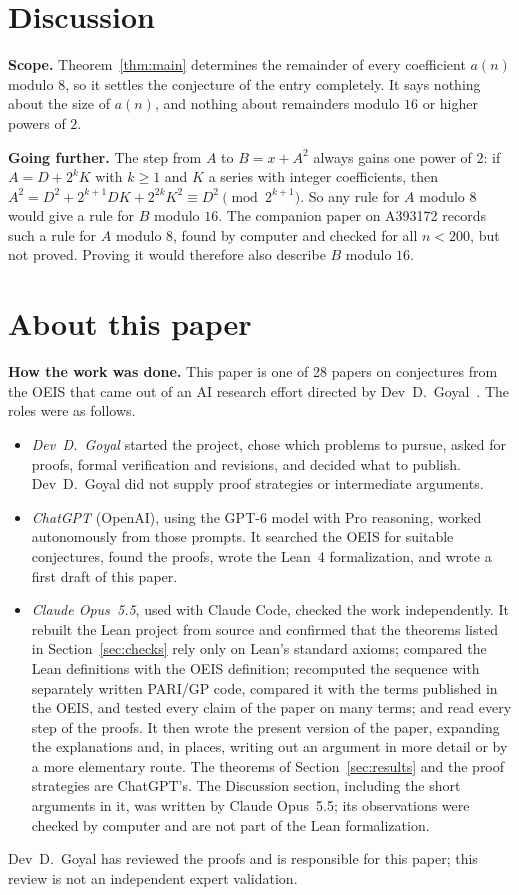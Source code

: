 \documentclass[11pt,a4paper]{article}
\theoremstyle{definition}
\theoremstyle{remark}
\newcommand{\para}[1]{\par\medskip\noindent\textbf{#1}\enspace}
\begin{document}
\section{Discussion}\label{sec:discussion}

\para{Scope.} Theorem~\ref{thm:main} determines the remainder of every coefficient $a(n)$ modulo $8$, so it settles the
conjecture of the entry completely. It says nothing about the size of $a(n)$, and nothing about remainders modulo $16$
or higher powers of $2$.

\para{Going further.} The step from $A$ to $B=x+A^2$ always gains one power of $2$: if $A=D+2^kK$ with $k\ge1$ and $K$ a
series with integer coefficients, then $A^2=D^2+2^{k+1}DK+2^{2k}K^2\equiv D^2\pmod{2^{k+1}}$. So any rule for $A$ modulo
$8$ would give a rule for $B$ modulo $16$. The companion paper on A393172 records such a rule for $A$ modulo $8$, found
by computer and checked for all $n<200$, but not proved. Proving it would therefore also describe $B$ modulo $16$.

\section*{About this paper}\label{sec:about}
\para{How the work was done.}
This paper is one of 28 papers on conjectures from the OEIS that came out of an AI research effort directed by
Dev~D.~Goyal~\cite{repo}. The roles were as follows.
\begin{itemize}
\item \emph{Dev~D.~Goyal} started the project, chose which problems to pursue, asked for proofs, formal verification and
revisions, and decided what to publish. Dev~D.~Goyal did not supply proof strategies or intermediate arguments.
\item \emph{ChatGPT} (OpenAI), using the GPT-6 model with Pro reasoning, worked autonomously from those prompts. It
searched the OEIS for suitable conjectures, found the proofs, wrote the Lean~4 formalization, and wrote a first draft
of this paper.
\item \emph{Claude Opus~5.5}, used with Claude Code, checked the work independently. It rebuilt the Lean project from source and confirmed that the theorems listed in Section~\ref{sec:checks} rely only on
Lean's standard axioms; compared the Lean definitions with the OEIS definition; recomputed the sequence with separately
written PARI/GP code, compared it with the terms published in the OEIS, and tested every claim of the paper on many
terms; and read every step of the proofs. It then wrote the present version of the paper, expanding the
explanations and, in places, writing out an argument in more detail or by a more elementary route. The theorems of
Section~\ref{sec:results} and the proof strategies are ChatGPT's. The Discussion section, including the short arguments
in it, was written by Claude Opus~5.5; its observations were checked by computer and are not part of the Lean
formalization.
\end{itemize}
Dev~D.~Goyal has reviewed the proofs and is responsible for this paper; this review is not an independent expert
validation.
\end{document}
